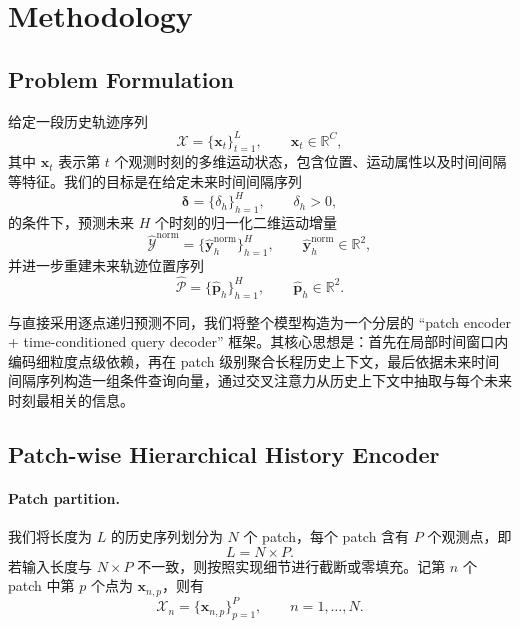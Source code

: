 
\section{Methodology}
\label{sec:method}

\subsection{Problem Formulation}
\label{subsec:problem}

给定一段历史轨迹序列
\begin{equation}
\mathcal{X} = \{\bm{x}_t\}_{t=1}^{L}, \qquad \bm{x}_t \in \mathbb{R}^{C},
\end{equation}
其中 $\bm{x}_t$ 表示第 $t$ 个观测时刻的多维运动状态，包含位置、运动属性以及时间间隔等特征。我们的目标是在给定未来时间间隔序列
\begin{equation}
\bm{\delta} = \{\delta_h\}_{h=1}^{H}, \qquad \delta_h > 0,
\end{equation}
的条件下，预测未来 $H$ 个时刻的归一化二维运动增量
\begin{equation}
\hat{\mathcal{Y}}^{\mathrm{norm}} = \{\hat{\bm{y}}_h^{\mathrm{norm}}\}_{h=1}^{H}, \qquad \hat{\bm{y}}_h^{\mathrm{norm}} \in \mathbb{R}^{2},
\end{equation}
并进一步重建未来轨迹位置序列
\begin{equation}
\hat{\mathcal{P}} = \{\hat{\bm{p}}_h\}_{h=1}^{H}, \qquad \hat{\bm{p}}_h \in \mathbb{R}^{2}.
\end{equation}

与直接采用逐点递归预测不同，我们将整个模型构造为一个分层的 ``patch encoder + time-conditioned query decoder'' 框架。其核心思想是：首先在局部时间窗口内编码细粒度点级依赖，再在 patch 级别聚合长程历史上下文，最后依据未来时间间隔序列构造一组条件查询向量，通过交叉注意力从历史上下文中抽取与每个未来时刻最相关的信息。

\subsection{Patch-wise Hierarchical History Encoder}
\label{subsec:encoder}

\paragraph{Patch partition.}
我们将长度为 $L$ 的历史序列划分为 $N$ 个 patch，每个 patch 含有 $P$ 个观测点，即
\begin{equation}
L = N \times P.
\end{equation}
若输入长度与 $N \times P$ 不一致，则按照实现细节进行截断或零填充。记第 $n$ 个 patch 中第 $p$ 个点为 $\bm{x}_{n,p}$，则有
\begin{equation}
\mathcal{X}_n = \{\bm{x}_{n,p}\}_{p=1}^{P}, \qquad n = 1,\dots,N.
\end{equation}

